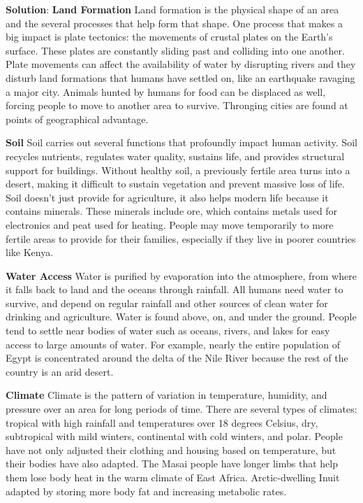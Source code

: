 \documentclass[
]{book}
\newenvironment{solution}{ {\bfseries Solution}:}{}
\begin{document}
\begin{questions}
\begin{solution}
\textbf{Land Formation}
Land formation is the physical shape of an area and the several processes that help form that shape. One process that makes a big impact is plate tectonics: the movements of crustal plates on the Earth's surface. These plates are constantly sliding past and colliding into one another. Plate movements can affect the availability of water by disrupting rivers and they disturb land formations that humans have settled on, like an earthquake ravaging a major city. Animals hunted by humans for food can be displaced as well, forcing people to move to another area to survive. Thronging cities are found at points of geographical advantage.

\textbf{Soil}
Soil carries out several functions that profoundly impact human activity. Soil recycles nutrients, regulates water quality, sustains life, and provides structural support for buildings. Without healthy soil, a previously fertile area turns into a desert, making it difficult to sustain vegetation and prevent massive loss of life. Soil doesn't just provide for agriculture, it also helps modern life because it contains minerals. These minerals include ore, which contains metals used for electronics and peat used for heating. People may move temporarily to more fertile areas to provide for their families, especially if they live in poorer countries like Kenya.

\textbf{Water Access}
Water is purified by evaporation into the atmosphere, from where it falls back to land and the oceans through rainfall. All humans need water to survive, and depend on regular rainfall and other sources of clean water for drinking and agriculture. Water is found above, on, and under the ground. People tend to settle near bodies of water such as oceans, rivers, and lakes for easy access to large amounts of water. For example, nearly the entire population of Egypt is concentrated around the delta of the Nile River because the rest of the country is an arid desert.

\textbf{Climate}
Climate is the pattern of variation in temperature, humidity, and pressure over an area for long periods of time. There are several types of climates: tropical with high rainfall and temperatures over 18 degrees Celsius, dry, subtropical with mild winters, continental with cold winters, and polar. People have not only adjusted their clothing and housing based on temperature, but their bodies have also adapted. The Masai people have longer limbs that help them lose body heat in the warm climate of East Africa. Arctic-dwelling Inuit adapted by storing more body fat and increasing metabolic rates.
\end{solution}


\end{questions}
\end{document}
